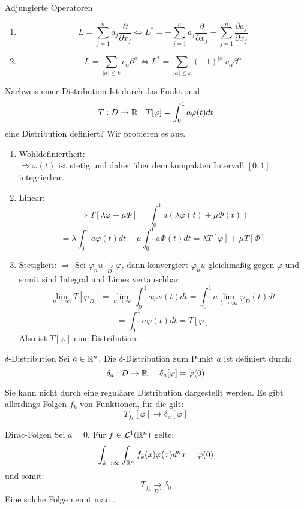 \begin{Beispiel}{Adjungierte Operatoren}
\begin{enumerate}
    \item $$L=\sum_{j=1}^n a_j \frac{\partial}{\partial x_j} \iff L^*=-\sum_{j=1}^n a_j \frac{\partial}{\partial x_j}-\sum_{j=1}^n \frac{\partial a_j}{\partial x_j}$$
    \item $$L=\sum_{|\alpha|\leq k}c_\alpha\partial^\alpha \iff L^*=\sum_{|\alpha|\leq k}(-1)^{|\alpha|}c_\alpha\partial^\alpha$$
\end{enumerate}
\end{Beispiel}
\begin{Beispiel}{Nachweis einer Distribution}
    Ist durch das Funktional
    $$T:D\rightarrow \mathbb{R} \quad T[\varphi]=\int_0^1 a\varphi(t) dt$$
    eine Distribution definiert? Wir probieren es aus.
    \begin{enumerate}
        \item Wohldefiniertheit: \\
        $\Rightarrow \varphi(t)$ ist stetig und daher über dem kompakten Intervall $[0,1]$ integrierbar.
        \item Linear: \\
        $$\Rightarrow T[\lambda \varphi + \mu \Phi] = \int_0^1 a(\lambda \varphi(t)+\mu\Phi(t))$$
        $$=\lambda \int_0^1 a\varphi(t)dt + \mu\int_0^1 a\Phi(t) dt = \lambda T[\varphi] + \mu T[\Phi]$$
        \item Stetigkeit:
        $\Rightarrow$ Sei $\varphi_nu \underset{D}{\rightarrow}\varphi$, dann konvergiert $\varphi_nu$ gleichmäßig gegen $\varphi$ und somit sind Integral und Limes vertauschbar:
        $$\lim_{\nu \rightarrow \infty} T[\varphi_D]=\lim_{\nu \rightarrow \infty} \int_0^1 a \varphi\nu(t)dt = \int_0^1 a \lim_{t\rightarrow \infty} \varphi_D(t) dt$$
        $$=\int_0^1 a \varphi(t) dt = T[\varphi]$$
        Also ist $T[\varphi]$ eine Distribution.
    \end{enumerate}
\end{Beispiel}
\begin{Def}{$\delta$-Distribution}
    Sei $a\in \mathbb{R}^n$. Die $\delta$-Distribution zum Punkt $a$ ist definiert durch:
    $$\delta_a: D\rightarrow \mathbb{R}, \quad \delta_a[\varphi]=\varphi(0)$$
\end{Def}
Sie kann nicht durch eine reguläare Distribution dargestellt werden. Es gibt allerdings Folgen $f_k$ von Funktionen, für die gilt:
$$T_{f_k}[\varphi]\rightarrow \delta_a[\varphi]$$
\begin{Def}{Dirac-Folgen}
Sei $a=0$. Für $f\in \mathcal{L}^1(\mathbb{R}^n)$ gelte:
$$\int_{k\rightarrow \infty} \int_{\mathbb{R}^n} f_k(x)\varphi(x) d^n x = \varphi(0)$$
und somit:
$$T_{f_k}\underset{D´}{\rightarrow} \delta_0$$
    Eine solche Folge nennt man . 
\end{Def}
